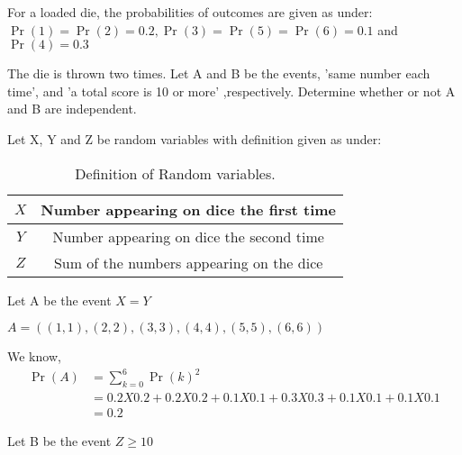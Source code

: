\documentclass[]{article}
\begin{document}
\providecommand{\qfunc}[1]{\ensuremath{Q\left(#1\right)}}
\providecommand{\gauss}[2]{\mathcal{N}\ensuremath{\left(#1,#2\right)}}
\providecommand{\diff}[2]{\ensuremath{\frac{d{#1}}{d{#2}}}}
\providecommand{\myceil}[1]{\left \lceil #1 \right \rceil }
\newcommand\figref{Fig.~\ref}
\newcommand\tabref{Table~\ref}
\newcommand{\sinc}{\,\text{sinc}\,}
\newcommand{\rect}{\,\text{rect}\,}

\let\vec\mathbf

For a loaded die, the probabilities of outcomes are given as under:
$\Pr(1) = \Pr(2) = 0.2, \Pr(3) = \Pr(5) = \Pr(6) = 0.1$ and $\Pr(4) = 0.3$

The die is thrown two times. Let A and B be the events, 'same number each time', and
'a total score is 10 or more' ,respectively. Determine whether or not A and B are independent.

\solution
Let X, Y and Z be random variables with definition given as under:

\begin{table}[H]
\centering
\begin{tabular}{|c|c|}
    \hline
    $X$ & Number appearing on dice the first time\\
    \hline
    $Y$ & Number appearing on dice the second time\\
    \hline
    $Z$ & Sum of the numbers appearing on the dice\\
    \hline
\end{tabular}
\label{tab:ncert/12/13/3/1/}
\caption{Definition of Random variables.}
\end{table}

Let A be the event $X = Y$

$A = ((1,1), (2,2), (3,3), (4,4), (5,5), (6,6))$

We know,
\begin{align}
\Pr(A) &= \sum_{k=0}^6{\Pr(k)}^2 \\
&= 0.2 X 0.2 + 0.2 X 0.2 + 0.1 X 0.1 + 0.3 X 0.3 + 0.1 X 0.1 + 0.1 X 0.1\\
&= 0.2
\end{align}

Let B be the event $Z \geq 10$
\end{document}
